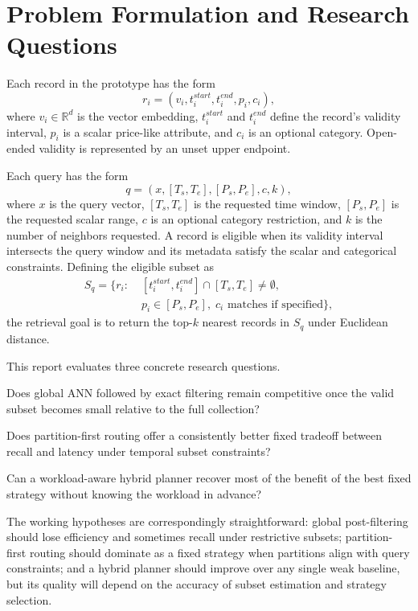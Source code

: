 \documentclass[sigconf,nonacm]{acmart}
\begin{document}
\section{Problem Formulation and Research Questions}

Each record in the prototype has the form
\[
r_i = (v_i, t_i^{start}, t_i^{end}, p_i, c_i),
\]
where $v_i \in \mathbb{R}^d$ is the vector embedding, $t_i^{start}$ and $t_i^{end}$ define the record's validity interval, $p_i$ is a scalar price-like attribute, and $c_i$ is an optional category. Open-ended validity is represented by an unset upper endpoint.

Each query has the form
\[
q = (x, [T_s, T_e], [P_s, P_e], c, k),
\]
where $x$ is the query vector, $[T_s, T_e]$ is the requested time window, $[P_s, P_e]$ is the requested scalar range, $c$ is an optional category restriction, and $k$ is the number of neighbors requested. A record is eligible when its validity interval intersects the query window and its metadata satisfy the scalar and categorical constraints. Defining the eligible subset as
\[
\begin{aligned}
S_q = \{r_i :\;& [t_i^{start}, t_i^{end}] \cap [T_s, T_e] \neq \emptyset,\\
&p_i \in [P_s,P_e],\; c_i \text{ matches if specified}\},
\end{aligned}
\]
the retrieval goal is to return the top-$k$ nearest records in $S_q$ under Euclidean distance.

This report evaluates three concrete research questions.
\begin{description}[leftmargin=*,style=nextline]
    \item[RQ1.] Does global ANN followed by exact filtering remain competitive once the valid subset becomes small relative to the full collection?
    \item[RQ2.] Does partition-first routing offer a consistently better fixed tradeoff between recall and latency under temporal subset constraints?
    \item[RQ3.] Can a workload-aware hybrid planner recover most of the benefit of the best fixed strategy without knowing the workload in advance?
\end{description}

The working hypotheses are correspondingly straightforward: global post-filtering should lose efficiency and sometimes recall under restrictive subsets; partition-first routing should dominate as a fixed strategy when partitions align with query constraints; and a hybrid planner should improve over any single weak baseline, but its quality will depend on the accuracy of subset estimation and strategy selection.
\end{document}
